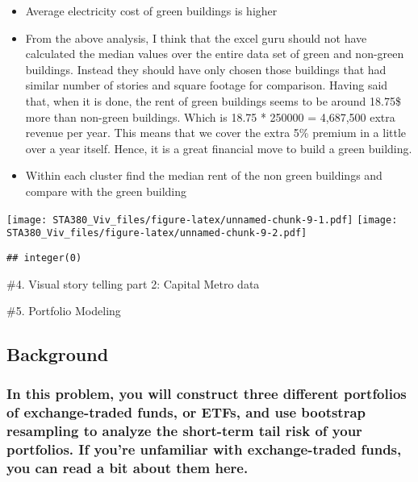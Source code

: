 \documentclass[
  12pt,
]{article}
\begin{document}
\begin{itemize}
\item
  Average electricity cost of green buildings is higher
\item
  From the above analysis, I think that the excel guru should not have
  calculated the median values over the entire data set of green and
  non-green buildings. Instead they should have only chosen those
  buildings that had similar number of stories and square footage for
  comparison. Having said that, when it is done, the rent of green
  buildings seems to be around 18.75\$ more than non-green buildings.
  Which is 18.75 * 250000 = 4,687,500 extra revenue per year. This means
  that we cover the extra 5\% premium in a little over a year itself.
  Hence, it is a great financial move to build a green building.
\item
  Within each cluster find the median rent of the non green buildings
  and compare with the green building
\end{itemize}

\texttt{[image: STA380\_Viv\_files/figure-latex/unnamed-chunk-9-1.pdf]}
\texttt{[image: STA380\_Viv\_files/figure-latex/unnamed-chunk-9-2.pdf]}

\begin{verbatim}
## integer(0)
\end{verbatim}

\nextpage

\#4. Visual story telling part 2: Capital Metro data

\nextpage

\#5. Portfolio Modeling

\hypertarget{background}{%
\subsection{Background}\label{background}}

\hypertarget{in-this-problem-you-will-construct-three-different-portfolios-of-exchange-traded-funds-or-etfs-and-use-bootstrap-resampling-to-analyze-the-short-term-tail-risk-of-your-portfolios.-if-youre-unfamiliar-with-exchange-traded-funds-you-can-read-a-bit-about-them-here.}{%
\subsubsection{In this problem, you will construct three different
portfolios of exchange-traded funds, or ETFs, and use bootstrap
resampling to analyze the short-term tail risk of your portfolios. If
you're unfamiliar with exchange-traded funds, you can read a bit about
them
here.}\label{in-this-problem-you-will-construct-three-different-portfolios-of-exchange-traded-funds-or-etfs-and-use-bootstrap-resampling-to-analyze-the-short-term-tail-risk-of-your-portfolios.-if-youre-unfamiliar-with-exchange-traded-funds-you-can-read-a-bit-about-them-here.}}
\end{document}
